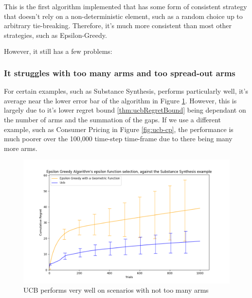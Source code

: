 This is the first algorithm implemented that has some form of consistent strategy that doesn't rely on a non-deterministic element, such as a random choice up to arbitrary tie-breaking. Therefore, it's much more consistent than most other strategies, such as Epsilon-Greedy.

However, it still has a few problems:

\subsubsection{It struggles with too many arms and too spread-out arms}

For certain examples, such as Substance Synthesis,  performs particularly well, it's average near the lower error bar of the  algorithm in Figure \ref{fig:ucb-ss}. However, this is largely due to it's lower regret bound \ref{thm:ucbRegretBound} being dependant on the number of arms and the summation of the gaps. If we use a different example, such as Consumer Pricing in Figure \ref{fig:ucb-cp}, the performance is much poorer over the 100,000 time-step time-frame due to there being many more arms.

\begin{figure}[h!]
    \centering
    \includegraphics[width=17cm]{report/images/UCB-trumping-epsilon-greedy-SS.png}
    \caption{UCB performs very well on scenarios with not too many arms}
    \label{fig:ucb-ss}
\end{figure}

